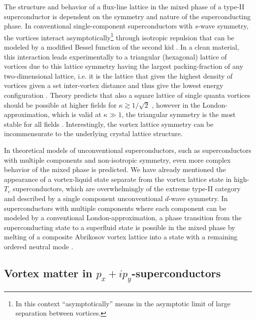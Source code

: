 The structure and behavior of a flux-line lattice in the mixed phase of a type-II superconductor is dependent on the symmetry and nature of the superconducting phase. In conventional single-component
superconductors with $s$-wave symmetry, the vortices interact asymptotically\footnote{In this context ``asymptotically'' means in the asymptotic limit of large separation between vortices.}
through isotropic repulsion that can be modeled by a modified Bessel function of the second kid \cite{Abrikosov56,Kramer71,Chaves11}. In a clean material, this interaction leads experimentally
to a triangular (hexagonal) lattice of vortices due to this lattice symmetry having the largest packing-fraction of any
two-dimensional lattice, i.e. it is the lattice that gives the highest density of vortices given a set inter-vortex distance and thus give the lowest energy configuration \cite{Cribier66,Essmann67}.
Theory predicts that also a square lattice of single quanta vortices should be possible at higher fields for $\kappa \gtrsim 1/\sqrt{2}$ \cite{Kramer71}, however in the London-approximation,
which is valid at $\kappa\gg1$, the triangular symmetry is the most stable for all fields \cite{Matricon64}.
Interestingly, the vortex lattice symmetry can be incommensurate to the underlying crystal lattice structure.

In theoretical models of unconventional superconductors, such as superconductors with multiple components and non-isotropic symmetry, even more complex behavior of the mixed phase is predicted.
We have already mentioned the appearance of a vortex-liquid state separate from the vortex lattice state in high-$T_c$ superconductors, which are overwhelmingly of the extreme type-II category
and described by a single component unconventional $d$-wave symmetry.
In superconductors with multiple components where each component can be modeled by a conventional London-approximation, a phase transition from the superconducting state to a superfluid state is possible
in the mixed phase by melting of a composite Abrikosov vortex lattice into a state with a remaining ordered neutral mode \cite{Smiseth05}.

\subsection{Vortex matter in $p_x+ip_y$-superconductors}


